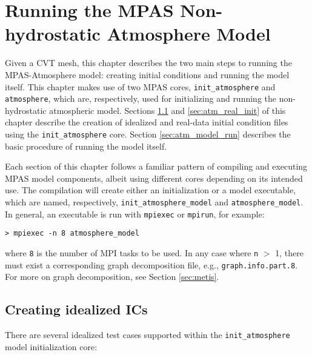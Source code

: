 
\chapter{Running the MPAS Non-hydrostatic Atmosphere Model}
\label{chap:running_mpas_a}

\setlength\LTleft{0.0in}

Given a CVT mesh, this chapter describes the two main steps to running the MPAS-Atmosphere model: creating initial conditions and running the model itself.  This chapter makes use of two MPAS cores, {\tt init\_atmosphere} and {\tt atmosphere}, which are, respectively, used for initializing and running the non-hydrostatic atmospheric model.  Sections \ref{sec:atm_ideal_init} and \ref{sec:atm_real_init} of this chapter describe the creation of idealized and real-data initial condition files using the {\tt init\_atmosphere} core. Section \ref{sec:atm_model_run} describes the basic procedure of running the model itself.

Each section of this chapter follows a familiar pattern of compiling and executing MPAS model components, albeit using different cores depending on its intended use.  The compilation will create either an initialization or a model executable, which are named, respectively, {\tt init\_atmosphere\_model} and {\tt atmosphere\_model}.  In general, an executable is run with {\tt mpiexec} or {\tt mpirun}, for example:

\vspace{12pt}
{\tt > mpiexec -n 8 atmosphere\_model}
\vspace{12pt}


\noindent where {\tt 8} is the number of MPI tasks to be used.  In any case where {\tt n} $>$ 1, there must exist a corresponding graph decomposition file, e.g., {\tt graph.info.part.8}. For more on graph decomposition, see Section \ref{sec:metis}.  

\section{Creating idealized ICs}
\label{sec:atm_ideal_init}

There are several idealized test cases supported within the {\tt init\_atmosphere} model initialization core:

